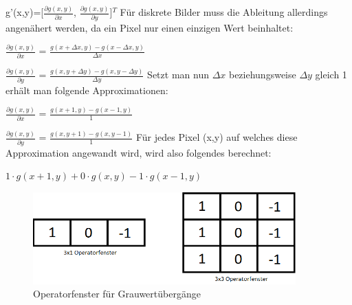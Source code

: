 \documentclass[12pt, a4paper]{article}
\begin{document}
g'(x,y)=[$\frac{\partial g(x,y)}{\partial x}$, $\frac{\partial g(x,y)}{\partial y}$]$^T$
\newline
\newline
Für diskrete Bilder muss die Ableitung allerdings angenähert werden, da ein Pixel nur einen einzigen Wert beinhaltet:
\newline

$\frac{\partial g(x,y)}{\partial x}$ = $\frac{g(x+\Delta x,y)-g(x-\Delta x,y)}{\Delta x}$
\newline

$\frac{\partial g(x,y)}{\partial y}$ = $\frac{g(x,y+\Delta y)-g(x,y-\Delta y)}{\Delta y}$
\newline
\newline
Setzt man nun $\Delta x$ beziehungsweise $\Delta y$ gleich 1 erhält man folgende Approximationen:
\newline

$\frac{\partial g(x,y)}{\partial x}$ = $\frac{g(x+1,y)-g(x-1,y)}{1}$
\newline

$\frac{\partial g(x,y)}{\partial y}$ = $\frac{g(x,y+1)-g(x,y-1)}{1}$
\newline
\newline
Für jedes Pixel (x,y) auf welches diese Approximation angewandt wird, wird also folgendes berechnet:
\newline

$1\cdot g(x+1,y)+0\cdot g(x,y)-1\cdot g(x-1,y)$
\newline

\begin{figure}[t]
\centering
\includegraphics[width=0.9\textwidth]{img/operatorfenster.png}
\caption{Operatorfenster für Grauwertübergänge}
\label{fig:OpFenster}
\end{figure}
\end{document}

